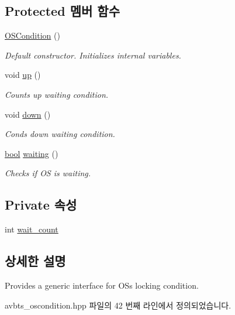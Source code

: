 \subsection*{Protected 멤버 함수}
\begin{DoxyCompactItemize}
\item 
\hyperlink{class_o_s_condition_a73aca03b480b63a7c62248f766ac8d61}{O\+S\+Condition} ()
\begin{DoxyCompactList}\small\item\em Default constructor. Initializes internal variables. \end{DoxyCompactList}\item 
void \hyperlink{class_o_s_condition_a0a1d932d49dd1079cfd0964b11adc7a0}{up} ()
\begin{DoxyCompactList}\small\item\em Counts up waiting condition. \end{DoxyCompactList}\item 
void \hyperlink{class_o_s_condition_a6663cf1e20c2f8162d29d31c8f6324e6}{down} ()
\begin{DoxyCompactList}\small\item\em Conds down waiting condition. \end{DoxyCompactList}\item 
\hyperlink{avb__gptp_8h_af6a258d8f3ee5206d682d799316314b1}{bool} \hyperlink{class_o_s_condition_a048a0b424dfef3a139f43ad4ae9c1904}{waiting} ()
\begin{DoxyCompactList}\small\item\em Checks if OS is waiting. \end{DoxyCompactList}\end{DoxyCompactItemize}
\subsection*{Private 속성}
\begin{DoxyCompactItemize}
\item 
int \hyperlink{class_o_s_condition_a3f608c86f5674663aa19921c25cce926}{wait\+\_\+count}
\end{DoxyCompactItemize}


\subsection{상세한 설명}
Provides a generic interface for OS\textquotesingle{}s locking condition. 

avbts\+\_\+oscondition.\+hpp 파일의 42 번째 라인에서 정의되었습니다.



